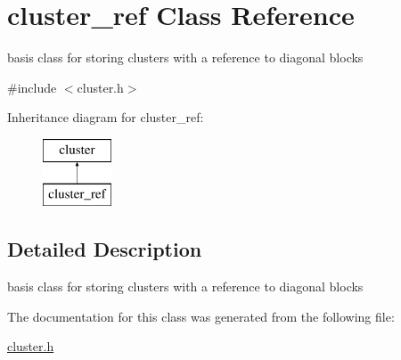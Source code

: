 \hypertarget{classcluster__ref}{
\section{cluster\-\_\-ref \-Class \-Reference}
\label{classcluster__ref}
}


basis class for storing clusters with a reference to diagonal blocks  




{\ttfamily \#include $<$cluster.\-h$>$}

\-Inheritance diagram for cluster\-\_\-ref\-:\begin{figure}[H]
\begin{center}
\leavevmode
\includegraphics[height=2.000000cm]{classcluster__ref}
\end{center}
\end{figure}


\subsection{\-Detailed \-Description}
basis class for storing clusters with a reference to diagonal blocks 

\-The documentation for this class was generated from the following file\-:\begin{DoxyCompactItemize}
\item 
\hyperlink{cluster_8h}{cluster.\-h}\end{DoxyCompactItemize}
